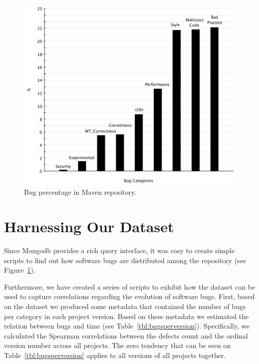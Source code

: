 \documentclass{sig-alternate}
\begin{document}
\begin{figure}[t]
	\centering
	\includegraphics[scale=0.32]{figures/bug_percent}
	\caption{Bug percentage in Maven repository.}
	\label{fig:bug-per} 
\end{figure}


\section{Harnessing Our Dataset}
\label{sec:exploit}

Since Mongo{\sc db} provides a rich query interface,
it was easy to create
simple scripts to find out
how software bugs are distributed among the
repository (see Figure~\ref{fig:bug-per}).

Furthermore, we have created a series of
scripts to exhibit how the dataset can be used
to capture correlations regarding
the evolution of software bugs.
First, based on the dataset we produced some metadata
that contained the number of
bugs per category in each project version. Based
on these metadata we estimated the relation between
bugs and time (see Table~\ref{tbl:bugsperversion}).
Specifically, we calculated the Spearman correlations between the defects
count and the ordinal version number across all projects.
The zero tendency that can be seen on Table~\ref{tbl:bugsperversion}
applies to all versions of all projects together.
\end{document}
